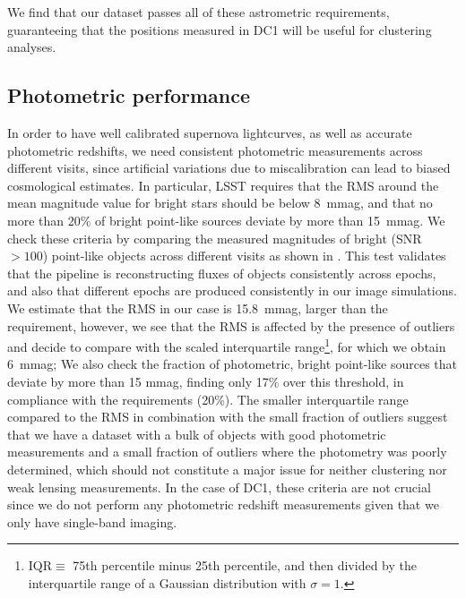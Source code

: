 \documentclass[a4paper,fleqn,usenatbib]{mnras}
\begin{document}

We find that our dataset passes all of these astrometric requirements, guaranteeing that the positions measured in DC1 will be useful for clustering analyses. 

\subsection{Photometric performance}
\label{sssec:photometry}
In order to have well calibrated supernova lightcurves, as well as accurate photometric redshifts, we need consistent photometric measurements across different visits, since artificial variations due to miscalibration can lead to biased cosmological estimates. In particular, LSST requires that the RMS around the mean magnitude value for bright stars should be below 8~mmag, and that no more than 20\% of bright point-like sources deviate by more than 15~mmag. We check these criteria by comparing the measured magnitudes of bright (SNR $> 100$) point-like objects across different visits as shown in . This test validates that the pipeline is reconstructing fluxes of objects consistently across epochs, and also that different epochs are produced consistently in our image simulations. We estimate that the RMS in our case is 15.8~mmag, larger than the requirement, however, we see that the RMS is affected by the presence of outliers and decide to compare with the scaled interquartile range\footnote{IQR$\equiv$ 75th percentile minus 25th percentile, and then divided by the interquartile range of a Gaussian distribution with $\sigma=1$.}, for which we obtain 6~mmag; We also check the fraction of photometric, bright point-like sources that deviate by more than 15 mmag, finding only 17\% over this threshold, in compliance with the requirements (20\%). The smaller interquartile range compared to the RMS in combination with the small fraction of outliers suggest that we have a dataset with a bulk of objects with good photometric measurements and a small fraction of outliers where the photometry was poorly determined, which should not constitute a major issue for neither clustering nor weak lensing measurements. In the case of DC1, these criteria are not crucial since we do not perform any photometric redshift measurements given that we only have single-band imaging.
\end{document}
